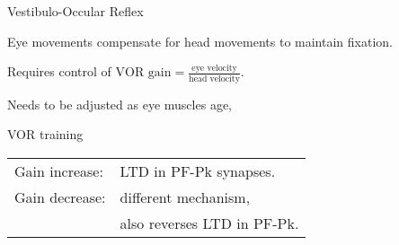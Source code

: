 \documentclass{beamer}%
\begin{document}
%
%

\begin{frame}{Vestibulo-Occular Reflex}
%
 \parbox[t]{0.4\linewidth}{}
 \parbox[t]{0.59\linewidth}{%
 Eye movements compensate for head movements to maintain fixation.

 \vp Requires control of $\text{VOR gain} = \frac{\text{eye velocity}}{\text{head velocity}}$.

 \vp Needs to be adjusted as eye muscles age, \etc
 }

%
\end{frame}



\begin{frame}{VOR training}
%
 \parbox[t]{0.2\linewidth}{%

   \vp{}
   }
 \hspace{0.15\linewidth}
 \parbox[t]{0.59\linewidth}{%

   \vp \begin{tabular}{ll}
   Gain increase: & LTD in PF-Pk synapses.\\
   Gain decrease: & different mechanism,\\
    & also reverses LTD in PF-Pk.
   \end{tabular}
 }

%
\end{frame}
\end{document}
